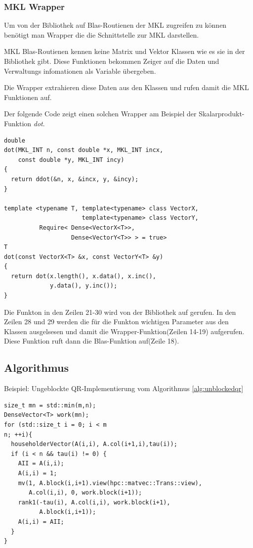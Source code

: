 \subsubsection{MKL Wrapper}
Um von der Bibliothek auf Blas-Routienen der MKL zugreifen zu können benötigt man Wrapper die die Schnittstelle zur MKL darstellen.

MKL Blas-Routienen kennen keine Matrix und Vektor Klassen wie es sie in der Bibliothek gibt. Diese Funktionen bekommen Zeiger auf die Daten und Verwaltungs infomationen als Variable übergeben.

Die Wrapper extrahieren diese Daten aus den Klassen und rufen damit die MKL Funktionen auf.

Der folgende Code zeigt einen solchen Wrapper am Beispiel der Skalarprodukt-Funktion \textit{dot}.
\lstset{numbers=left,firstnumber=14}
\begin{lstlisting}
double
dot(MKL_INT n, const double *x, MKL_INT incx,
    const double *y, MKL_INT incy)
{
  return ddot(&n, x, &incx, y, &incy);
}

template <typename T, template<typename> class VectorX,
                      template<typename> class VectorY,
          Require< Dense<VectorX<T>>,
                   Dense<VectorY<T>> > = true>
T
dot(const VectorX<T> &x, const VectorY<T> &y)
{
  return dot(x.length(), x.data(), x.inc(), 
             y.data(), y.inc());
}
\end{lstlisting}
Die Funkton in den Zeilen 21-30 wird von der Bibliothek auf gerufen.
In den Zeilen 28 und 29 werden die für die Funkton wichtigen Parameter aus den Klassen ausgelsesen und damit die Wrapper-Funktion(Zeilen 14-19) aufgerufen. Diese Funktion ruft dann die Blas-Funktion auf(Zeile 18).


\subsection{Algorithmus}

Beispiel: Ungeblockte QR-Implementierung vom Algorithmus \ref{alg:unblockedqr}
\lstset{numbers=left,firstnumber=1}
\begin{lstlisting}
size_t mn = std::min(m,n);
DenseVector<T> work(mn);
for (std::size_t i = 0; i < m
n; ++i){
  householderVector(A(i,i), A.col(i+1,i),tau(i));
  if (i < n && tau(i) != 0) {
    AII = A(i,i);
    A(i,i) = 1;
    mv(1, A.block(i,i+1).view(hpc::matvec::Trans::view),
       A.col(i,i), 0, work.block(i+1));
    rank1(-tau(i), A.col(i,i), work.block(i+1), 
          A.block(i,i+1));
    A(i,i) = AII;
  }
}
\end{lstlisting}

